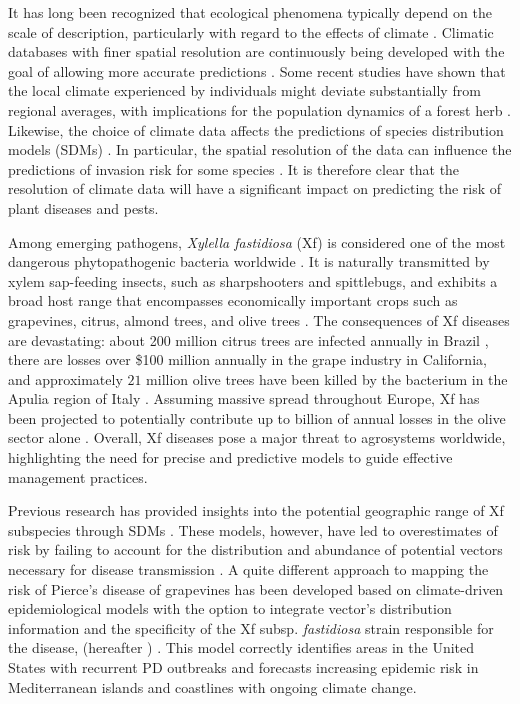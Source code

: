 It has long  been recognized that ecological phenomena typically depend on
the scale of description,  particularly with regard to the effects of climate
\cite{Levin1992}. Climatic databases with finer spatial resolution are
continuously being developed with the goal of allowing more accurate
predictions \cite{Navarro-Racines2020}.  Some recent studies have shown that
the local climate experienced by individuals might deviate substantially from
regional averages, with implications for the population dynamics of a forest
herb \cite{Christiansen2024}. Likewise, the choice of climate data affects the
predictions of species distribution models (SDMs) \cite{Abdulwahab2022}. In
particular, the spatial resolution of the data can influence the predictions of
invasion risk for some species \cite{Dubos2023}.  It is therefore clear that
the resolution of climate data will have a significant impact on predicting the
risk of plant diseases and pests.

Among emerging pathogens, \textit{Xylella fastidiosa} (Xf) is considered one
of the most dangerous phytopathogenic bacteria worldwide
\cite{Hopkins2002,EFSA_xf}. It is naturally transmitted by xylem sap-feeding
insects, such as sharpshooters and spittlebugs, and exhibits a broad host range
that encompasses economically important crops such as grapevines, citrus,
almond trees, and olive trees \cite{Redak2004,EFSA_xf}. The consequences of Xf
diseases are devastating: about 200 million citrus trees are  infected annually
in Brazil \cite{Lindow2019}, there are	losses over \$100 million annually in
the grape industry in California, \cite{Tumber2014} and approximately
$21$ million olive trees have been killed by the bacterium in the Apulia region
of Italy  \cite{Sabelli2023}. Assuming massive spread throughout Europe, Xf has
been projected to potentially contribute up to  billion of annual
losses in the olive sector alone \cite{Schneider2020}. Overall, Xf diseases
pose a major threat to agrosystems worldwide, highlighting the need for precise
and predictive models to guide effective management practices.

Previous research has provided insights into the potential geographic range
of Xf subspecies through SDMs \cite{Bosso2016b, Godefroid2022}. These models,
however, have led to overestimates of risk by failing to account for the
distribution and abundance of potential vectors necessary for disease
transmission  \cite{Godefroid2022_vector}.  A quite different approach to
mapping the risk of Pierce's disease of grapevines has been developed based on
climate-driven epidemiological models with the option to integrate vector's
distribution information and the specificity of the Xf subsp.
\textit{fastidiosa} strain responsible for the disease,
(hereafter \xf{}) \cite{GimenezRomero2022_CommsBio}. This model correctly
identifies areas in the United States with recurrent  PD outbreaks and
forecasts increasing epidemic risk in Mediterranean islands and coastlines
with ongoing climate change.

